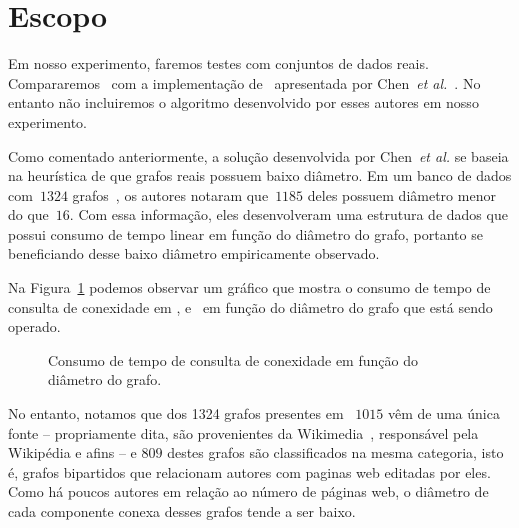 \section{Escopo}

Em nosso experimento, faremos testes com conjuntos de dados reais.
Compararemos~\HDT{} com a implementação de~\HK{} apresentada por Chen~\textit{et al.}~\cite{QC22}.
No entanto não incluiremos o algoritmo desenvolvido por esses autores em nosso experimento.

Como comentado anteriormente, a solução desenvolvida por Chen~\textit{et al.} se baseia na heurística de que grafos reais possuem baixo diâmetro.
Em um banco de dados com~$1324$ grafos~\cite{KONECT}, os autores notaram que~$1185$ deles possuem diâmetro menor do que~$16$.
Com essa informação, eles desenvolveram uma estrutura de dados que possui consumo de tempo linear em função do diâmetro do grafo,
portanto se beneficiando desse baixo diâmetro empiricamente observado.

Na Figura~\ref{fig:sensibilidade-diametro} podemos observar um gráfico que mostra o consumo de tempo de consulta de conexidade em \HK{}, \HDT{} e~\CLHB{} em função do diâmetro do grafo que está sendo operado.

\begin{figure}
\caption{Consumo de tempo de consulta de conexidade em função do diâmetro do grafo.}
\label{fig:sensibilidade-diametro}
\end{figure}

No entanto, notamos que dos 1324 grafos presentes em~\cite{KONECT} $1015$ vêm de uma única fonte -- 
propriamente dita, são provenientes da Wikimedia~\cite{wikimedia}, responsável pela Wikipédia e afins -- 
e $809$ destes grafos são classificados na mesma categoria, isto é, grafos bipartidos que relacionam autores com paginas web editadas por eles. Como há poucos autores em relação ao número de páginas web, o diâmetro de cada componente conexa desses grafos tende a ser baixo.

